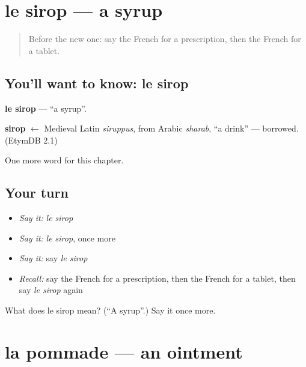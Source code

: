 \section[le sirop]{le sirop — a syrup}

\label{lesson:FR-C215-sirop}



\begin{quote}
Before the new one: say the French for a prescription, then the French for a tablet.
\end{quote}

\subsection*{You'll want to know: le sirop}
\textbf{le sirop} — \textquotedblleft{}a syrup\textquotedblright{}.

\begin{cousinweb}
\textbf{sirop} $\leftarrow$ Medieval Latin \emph{siruppus}, from Arabic \emph{sharab}, \textquotedblleft{}a drink\textquotedblright{} — borrowed. (EtymDB 2.1)
\end{cousinweb}

\begin{grammarlens}[title={What you've built}]
One more word for this chapter.
\end{grammarlens}

\subsection*{Your turn}
\begin{itemize}
\raggedright
  \item \emph{Say it:} \emph{le sirop}
  \item \emph{Say it:} \emph{le sirop}, once more
  \item \emph{Say it:} say \emph{le sirop}
  \item \emph{Recall:} say the French for a prescription, then the French for a tablet, then say \emph{le sirop} again
\end{itemize}

\begin{tcolorbox}[breakable,colback=teal!4,colframe=teal!35!black,title={Before you move on}]
What does le sirop mean? (\textquotedblleft{}A syrup\textquotedblright{}.) Say it once more.
\end{tcolorbox}
\section[la pommade]{la pommade — an ointment}

